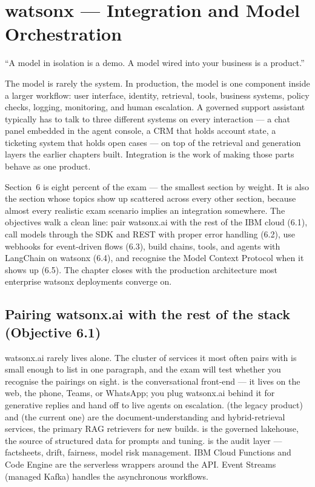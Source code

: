 \chapter{watsonx --- Integration and Model Orchestration}
\label{ch:integration}

\epigraph{``A model in isolation is a demo. A model wired into your business is a product.''}{}

The model is rarely the system. In production, the model is one component inside a larger workflow: user interface, identity, retrieval, tools, business systems, policy checks, logging, monitoring, and human escalation. A governed support assistant typically has to talk to three different systems on every interaction --- a chat panel embedded in the agent console, a CRM that holds account state, a ticketing system that holds open cases --- on top of the retrieval and generation layers the earlier chapters built. Integration is the work of making those parts behave as one product.

Section~6 is eight percent of the exam --- the smallest section by weight. It is also the section whose topics show up scattered across every other section, because almost every realistic exam scenario implies an integration somewhere. The objectives walk a clean line: pair watsonx.ai with the rest of the IBM cloud (6.1), call models through the SDK and REST with proper error handling (6.2), use webhooks for event-driven flows (6.3), build chains, tools, and agents with LangChain on watsonx (6.4), and recognise the Model Context Protocol when it shows up (6.5). The chapter closes with the production architecture most enterprise watsonx deployments converge on.

\section{Pairing watsonx.ai with the rest of the stack (Objective 6.1)}

watsonx.ai rarely lives alone. The cluster of services it most often pairs with is small enough to list in one paragraph, and the exam will test whether you recognise the pairings on sight.  is the conversational front-end --- it lives on the web, the phone, Teams, or WhatsApp; you plug watsonx.ai behind it for generative replies and hand off to live agents on escalation.  (the legacy product) and  (the current one) are the document-understanding and hybrid-retrieval services, the primary RAG retrievers for new builds.  is the governed lakehouse, the source of structured data for prompts and tuning.  is the audit layer --- factsheets, drift, fairness, model risk management. IBM Cloud Functions and Code Engine are the serverless wrappers around the API. Event Streams (managed Kafka) handles the asynchronous workflows.

